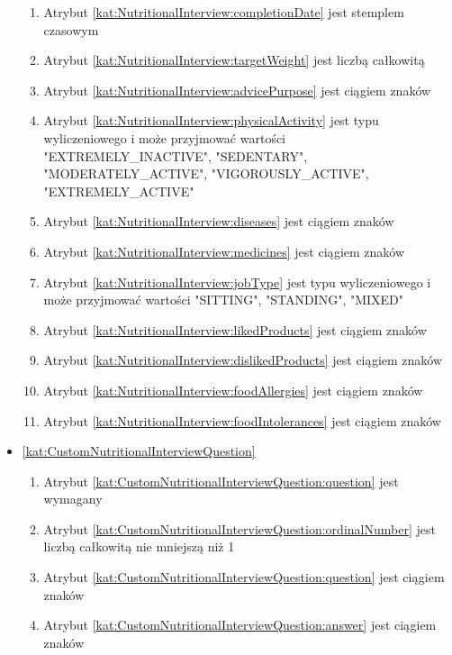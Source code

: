 \begin{itemize}[label={\textbf{Ograniczenia dla}}, wide, labelwidth=!, labelindent=0pt]
\begin{enumerate}[label={\textbf{OGR/\protect\threedigits{\arabic{enumi}}}}, wide, labelwidth=!, align=left, leftmargin=3cm, resume]
        \item Atrybut \ref{kat:NutritionalInterview:completionDate} jest stemplem czasowym
        \item Atrybut \ref{kat:NutritionalInterview:targetWeight} jest liczbą całkowitą
        \item Atrybut \ref{kat:NutritionalInterview:advicePurpose} jest ciągiem znaków
        \item Atrybut \ref{kat:NutritionalInterview:physicalActivity} jest typu wyliczeniowego i może przyjmować wartości "EXTREMELY\_INACTIVE", "SEDENTARY", "MODERATELY\_ACTIVE", "VIGOROUSLY\_ACTIVE", "EXTREMELY\_ACTIVE"
        \item Atrybut \ref{kat:NutritionalInterview:diseases} jest ciągiem znaków
        \item Atrybut \ref{kat:NutritionalInterview:medicines} jest ciągiem znaków
        \item Atrybut \ref{kat:NutritionalInterview:jobType} jest typu wyliczeniowego i może przyjmować wartości "SITTING", "STANDING", "MIXED"
        \item Atrybut \ref{kat:NutritionalInterview:likedProducts} jest ciągiem znaków
        \item Atrybut \ref{kat:NutritionalInterview:dislikedProducts} jest ciągiem znaków
        \item Atrybut \ref{kat:NutritionalInterview:foodAllergies} jest ciągiem znaków
        \item Atrybut \ref{kat:NutritionalInterview:foodIntolerances} jest ciągiem znaków
    \end{enumerate}

    \item\ref{kat:CustomNutritionalInterviewQuestion}
    \begin{enumerate}[label={\textbf{OGR/\protect\threedigits{\arabic{enumi}}}}, wide, labelwidth=!, align=left, leftmargin=3cm, resume]
        \item Atrybut \ref{kat:CustomNutritionalInterviewQuestion:question} jest wymagany

        \item Atrybut \ref{kat:CustomNutritionalInterviewQuestion:ordinalNumber} jest liczbą całkowitą nie mniejszą niż 1
        \item Atrybut \ref{kat:CustomNutritionalInterviewQuestion:question} jest ciągiem znaków
        \item Atrybut \ref{kat:CustomNutritionalInterviewQuestion:answer} jest ciągiem znaków
    \end{enumerate}


\end{itemize}
